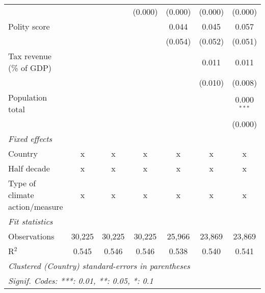 \begin{tabular}{lcccccc}
                                                                              &               &                & (0.000)        & (0.000)        & (0.000)        & (0.000)\\   
   Polity score                                                               &               &                &                & 0.044          & 0.045          & 0.057\\   
                                                                              &               &                &                & (0.054)        & (0.052)        & (0.051)\\   
   Tax revenue (\% of GDP)                                                    &               &                &                &                & 0.011          & 0.011\\   
                                                                              &               &                &                &                & (0.010)        & (0.008)\\   
   Population total                                                           &               &                &                &                &                & 0.000$^{***}$\\   
                                                                              &               &                &                &                &                & (0.000)\\   
   \emph{Fixed effects}\\
   Country                                                                    & x             & x              & x              & x              & x              & x\\  
   Half decade                                                                & x             & x              & x              & x              & x              & x\\  
   Type of climate action/measure                                             & x             & x              & x              & x              & x              & x\\  
   \midrule \emph{Fit statistics}\\
   Observations                                                               & 30,225        & 30,225         & 30,225         & 25,966         & 23,869         & 23,869\\  
   R$^2$                                                                      & 0.545         & 0.546          & 0.546          & 0.538          & 0.540          & 0.541\\  
   \midrule
   \multicolumn{7}{l}{\emph{Clustered (Country) standard-errors in parentheses}}\\
   \multicolumn{7}{l}{\emph{Signif. Codes: ***: 0.01, **: 0.05, *: 0.1}}\\
\end{tabular}
\par\endgroup


